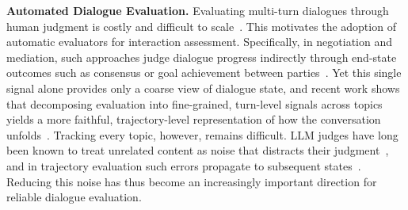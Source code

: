 \smallskip\smallskip\noindent\textbf{Automated Dialogue Evaluation.} 
Evaluating multi-turn dialogues through human judgment is costly and difficult to scale~\citep{zheng2023judging, deshpande2025multichallenge}. This motivates the adoption of automatic evaluators for interaction assessment. 
%
Specifically, in negotiation and mediation, such approaches judge dialogue progress indirectly through end-state outcomes such as consensus or goal achievement between parties~\citep{zhou2024sotopia, chen2026simulating}.
%
Yet this single signal alone provides only a coarse view of dialogue state, and recent work shows that decomposing evaluation into fine-grained, turn-level signals across topics yields a more faithful, trajectory-level representation of how the conversation unfolds~\citep{mannekote2023agreement, zhang2025sotopia, liu2025promediate}.
%
Tracking every topic, however, remains difficult. LLM judges have long been known to treat unrelated content as noise that distracts their judgment~\citep{ye2025justice}, and in trajectory evaluation such errors propagate to subsequent states~\citep{liu2025promediate}. Reducing this noise has thus become an increasingly important direction for reliable dialogue
evaluation.


